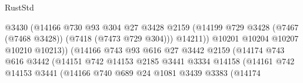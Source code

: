 \begin{lexlean}{RustStd}
\begin{coremodule}
                                              @3430
                                              (@14166
                                                @730
                                                @93
                                                @304
                                                @27
                                                @3428
                                                @2159
                                                (@14199
                                                  @729
                                                  @3428
                                                  (@7467 (@7468 @3428))
                                                  (@7418 (@7473 @729 @304)))
                                                @14211))
                                            @10201
                                            @10204
                                            @10207
                                            @10210
                                            @10213))
                                        (@14166
                                          @743
                                          @93
                                          @616
                                          @27
                                          @3442
                                          @2159
                                          (@14174
                                            @743
                                            @616
                                            @3442
                                            (@14151
                                              @742
                                              @14153
                                              @2185
                                              @3441
                                              @3334
                                              @14158
                                              (@14161
                                                @742
                                                @14153
                                                @3441
                                                (@14166
                                                  @740
                                                  @689
                                                  @24
                                                  @1081
                                                  @3439
                                                  @3383
                                                  (@14174

\end{coremodule}
\end{lexlean}

